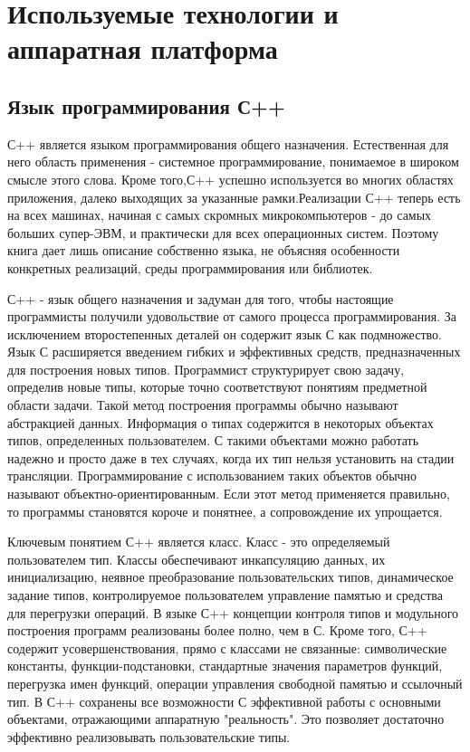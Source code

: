 \section{Используемые технологии и аппаратная платформа}


\subsection{Язык программирования С++}

С++ является языком программирования общего назначения. Естественная для него область
применения - системное программирование, понимаемое в широком смысле этого слова. Кроме того,С++ успешно используется во многих областях приложения, далеко выходящих за указанные рамки.Реализации С++ теперь есть на всех машинах, начиная с самых скромных микрокомпьютеров - до самых больших супер-ЭВМ, и практически для всех операционных систем. Поэтому книга дает лишь описание собственно языка, не объясняя особенности конкретных реализаций, среды программирования или библиотек.

С++ - язык общего назначения и задуман для того, чтобы настоящие программисты получили
удовольствие от самого процесса программирования. За исключением второстепенных деталей он содержит язык С как подмножество. Язык С расширяется введением гибких и эффективных средств, предназначенных для построения новых типов. Программист структурирует свою задачу, определив новые типы, которые точно соответствуют понятиям предметной области задачи. Такой метод построения программы обычно называют абстракцией данных. Информация о типах содержится в некоторых объектах типов, определенных пользователем. С такими объектами можно работать надежно и просто даже в тех случаях, когда их тип нельзя установить на стадии трансляции. Программирование с использованием таких объектов обычно называют объектно-ориентированным. Если этот метод применяется правильно, то программы становятся короче и понятнее, а сопровождение их упрощается.

Ключевым понятием С++ является класс. Класс - это определяемый пользователем тип. Классы обеспечивают инкапсуляцию данных, их инициализацию, неявное преобразование пользовательских типов, динамическое задание типов, контролируемое пользователем управление памятью и средства для перегрузки операций. В языке С++ концепции контроля типов и модульного построения программ реализованы более полно, чем в С. Кроме того, С++ содержит усовершенствования, прямо с классами не связанные: символические константы, функции-подстановки, стандартные значения параметров
функций, перегрузка имен функций, операции управления свободной памятью и ссылочный тип. В С++ сохранены все возможности С эффективной работы с основными объектами, отражающими аппаратную "реальность". Это позволяет достаточно эффективно реализовывать пользовательские типы.

